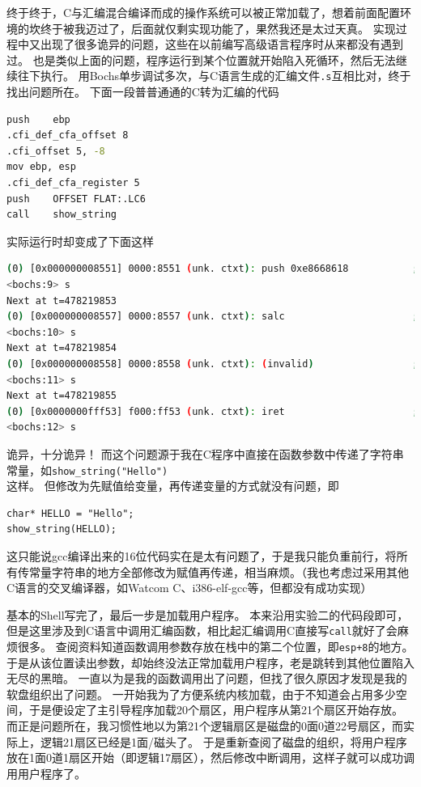 \documentclass[logo,reportComp]{thesis}
\begin{document}
终于终于，C与汇编混合编译而成的操作系统可以被正常加载了，想着前面配置环境的坎终于被我迈过了，后面就仅剩实现功能了，果然我还是太过天真。
实现过程中又出现了很多诡异的问题，这些在以前编写高级语言程序时从来都没有遇到过。
也是类似上面的问题，程序运行到某个位置就开始陷入死循环，然后无法继续往下执行。
用Bochs单步调试多次，与C语言生成的汇编文件\verb'.s'互相比对，终于找出问题所在。
下面一段普普通通的C转为汇编的代码
\begin{lstlisting}[language=bash]
push	ebp
.cfi_def_cfa_offset 8
.cfi_offset 5, -8
mov	ebp, esp
.cfi_def_cfa_register 5
push	OFFSET FLAT:.LC6
call	show_string
\end{lstlisting}
实际运行时却变成了下面这样
\begin{lstlisting}[language=bash]
(0) [0x000000008551] 0000:8551 (unk. ctxt): push 0xe8668618           ; 6668188666e8
<bochs:9> s
Next at t=478219853
(0) [0x000000008557] 0000:8557 (unk. ctxt): salc                      ; d6
<bochs:10> s
Next at t=478219854
(0) [0x000000008558] 0000:8558 (unk. ctxt): (invalid)                 ; feff
<bochs:11> s
Next at t=478219855
(0) [0x0000000fff53] f000:ff53 (unk. ctxt): iret                      ; cf
<bochs:12> s
\end{lstlisting}
诡异，十分诡异！
而这个问题源于我在C程序中直接在函数参数中传递了字符串常量，如\verb'show_string("Hello")'\\
这样。
但修改为先赋值给变量，再传递变量的方式就没有问题，即
\begin{lstlisting}
char* HELLO = "Hello";
show_string(HELLO);
\end{lstlisting}
这只能说gcc编译出来的16位代码实在是太有问题了，于是我只能负重前行，将所有传常量字符串的地方全部修改为赋值再传递，相当麻烦。（我也考虑过采用其他C语言的交叉编译器，如Watcom C、i386-elf-gcc等，但都没有成功实现）

基本的Shell写完了，最后一步是加载用户程序。
本来沿用实验二的代码段即可，但是这里涉及到C语言中调用汇编函数，相比起汇编调用C直接写\verb'call'就好了会麻烦很多。
查阅资料知道函数调用参数存放在栈中的第二个位置，即\verb'esp+8'的地方。
于是从该位置读出参数，却始终没法正常加载用户程序，老是跳转到其他位置陷入无尽的黑暗。
一直以为是我的函数调用出了问题，但找了很久原因才发现是我的软盘组织出了问题。
一开始我为了方便系统内核加载，由于不知道会占用多少空间，于是便设定了主引导程序加载20个扇区，用户程序从第21个扇区开始存放。
而正是问题所在，我习惯性地以为第21个逻辑扇区是磁盘的0面0道22号扇区，而实际上，逻辑21扇区已经是1面/磁头了。
于是重新查阅了磁盘的组织，将用户程序放在1面0道1扇区开始（即逻辑17扇区），然后修改中断调用，这样子就可以成功调用用户程序了。
\end{document}
